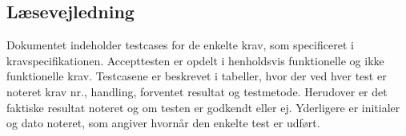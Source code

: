 \subsection{Læsevejledning}
Dokumentet indeholder testcases for de enkelte krav, som specificeret i kravspecifikationen. Accepttesten er opdelt i henholdsvis funktionelle og ikke funktionelle krav. Testcasene er beskrevet i tabeller, hvor der ved hver test er noteret krav nr., handling, forventet resultat og testmetode. Herudover er det faktiske resultat noteret og om testen er godkendt eller ej. Yderligere er initialer og dato noteret, som angiver hvornår den enkelte test er udført. 